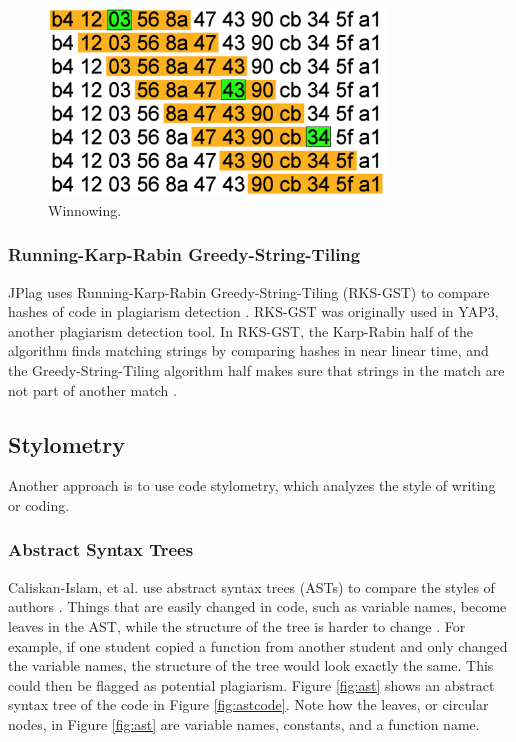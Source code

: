 \documentclass[10pt,journal,compsoc]{IEEEtran}
\begin{document}
			\begin{figure}[h!]
				\includegraphics[width=0.8\textwidth]{Winnowing.png}
				\caption{Winnowing.}
				\label{fig:winnowing1}
			\end{figure}
		
			\subsubsection{Running-Karp-Rabin Greedy-String-Tiling}
			JPlag uses Running-Karp-Rabin Greedy-String-Tiling (RKS-GST) to compare hashes of code in plagiarism detection \cite{prechelt+malpohl+philippsen}. RKS-GST was originally used in YAP3, another plagiarism detection tool. In RKS-GST, the Karp-Rabin half of the algorithm finds matching strings by comparing hashes in near linear time, and the Greedy-String-Tiling algorithm half makes sure that strings in the match are not part of another match \cite{wise}.
		
		\subsection{Stylometry}
		Another approach is to use code stylometry, which analyzes the style of writing or coding.
		
			\subsubsection{Abstract Syntax Trees}
			Caliskan-Islam, et al. use abstract syntax trees (ASTs) to compare the styles of authors \cite{caliskan-islam+harang+liu}. Things that are easily changed in code, such as variable names, become leaves in the AST, while the structure of the tree is harder to change \cite{caliskan-islam+harang+liu}. For example, if one student copied a function from another student and only changed the variable names, the structure of the tree would look exactly the same. This could then be flagged as potential plagiarism. Figure \ref{fig:ast} shows an abstract syntax tree of the code in Figure \ref{fig:astcode}. Note how the leaves, or circular nodes, in Figure \ref{fig:ast} are variable names, constants, and a function name.
		
\end{document}

